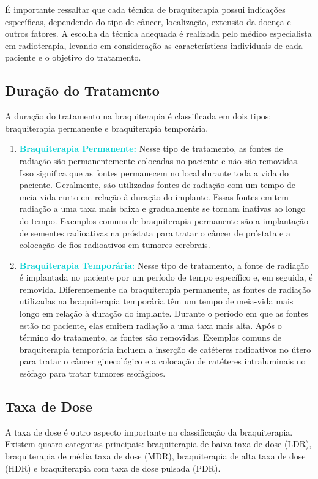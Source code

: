 \documentclass[11pt,a4paper]{article}
\begin{document}
	É importante ressaltar que cada técnica de braquiterapia possui indicações específicas, dependendo do tipo de câncer, localização, extensão da doença e outros fatores. A escolha da técnica adequada é realizada pelo médico especialista em radioterapia, levando em consideração as características individuais de cada paciente e o objetivo do tratamento.

\subsection*{Duração do Tratamento}

	A duração do tratamento na braquiterapia é classificada em dois tipos: braquiterapia permanente e braquiterapia temporária.

	\begin{enumerate}

		\item \textcolor{DarkTurquoise}{\textbf{Braquiterapia Permanente:}}  Nesse tipo de tratamento, as fontes de radiação são permanentemente colocadas no paciente e não são removidas. Isso significa que as fontes permanecem no local durante toda a vida do paciente. Geralmente, são utilizadas fontes de radiação com um tempo de meia-vida curto em relação à duração do implante. Essas fontes emitem radiação a uma taxa mais baixa e gradualmente se tornam inativas ao longo do tempo. Exemplos comuns de braquiterapia permanente são a implantação de sementes radioativas na próstata para tratar o câncer de próstata e a colocação de fios radioativos em tumores cerebrais.
		
		\item \textcolor{DarkTurquoise}{\textbf{Braquiterapia Temporária:}} Nesse tipo de tratamento, a fonte de radiação é implantada no paciente por um período de tempo específico e, em seguida, é removida. Diferentemente da braquiterapia permanente, as fontes de radiação utilizadas na braquiterapia temporária têm um tempo de meia-vida mais longo em relação à duração do implante. Durante o período em que as fontes estão no paciente, elas emitem radiação a uma taxa mais alta. Após o término do tratamento, as fontes são removidas. Exemplos comuns de braquiterapia temporária incluem a inserção de catéteres radioativos no útero para tratar o câncer ginecológico e a colocação de catéteres intraluminais no esôfago para tratar tumores esofágicos.
		
	\end{enumerate}		

\subsection*{Taxa de Dose}
A taxa de dose é outro aspecto importante na classificação da braquiterapia. Existem quatro categorias principais: braquiterapia de baixa taxa de dose (LDR), braquiterapia de média taxa de dose (MDR), braquiterapia de alta taxa de dose (HDR) e braquiterapia com taxa de dose pulsada (PDR).
\end{document}
